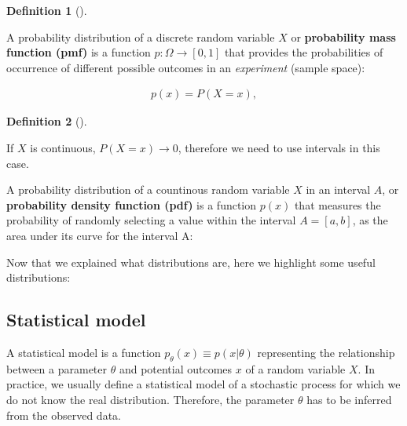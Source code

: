 \documentclass[
  letterpaper,
  12pt,
  british]{tufte-book}
\theoremstyle{plain}
\theoremstyle{plain}
\theoremstyle{definition}
\newtheorem{definition}{Definition}[chapter]
\theoremstyle{remark}
\begin{document}
\leavevmode{}%
\begin{definition}[]\label{def-probability_mass_function}

A probability distribution of a discrete random variable \(\mathit{X}\)
or \textbf{probability mass function (pmf)} is a function
\(p: \Omega \to [0,1]\) that provides the probabilities of occurrence of
different possible outcomes in an \emph{experiment} (sample space):

\end{definition}

\begin{align}
        p(\mathit{x}) = P(\mathit{X}= \mathit{x}), 
\end{align}

\leavevmode{}%
\begin{definition}[]\label{def-probability_density_function}

If \(\mathit{X}\) is continuous, \(P(\mathit{X}=\mathit{x})\to 0\),
therefore we need to use intervals in this case.

\end{definition}

A probability distribution of a countinous random variable
\(\mathit{X}\) in an interval \(A\), or \textbf{probability density
function (pdf)} is a function \(p(\mathit{x})\) that measures the
probability of randomly selecting a value within the interval
\(A=[a, b]\), as the area under its curve for the interval A:

Now that we explained what distributions are, here we highlight some
useful distributions:

\hypertarget{sec-statistical_model}{%
\subsection{Statistical model}\label{sec-statistical_model}}

A statistical model is a function
\(p_{\theta}(\mathit{x}) \equiv p(\mathit{x}| \theta)\) representing the
relationship between a parameter \(\theta\) and potential
outcomes \(\mathit{x}\) of a random variable \(\mathit{X}\). In
practice, we usually define a statistical model of a stochastic process
for which we do not know the real distribution. Therefore, the parameter
\(\theta\) has to be inferred from the observed data.
\end{document}
